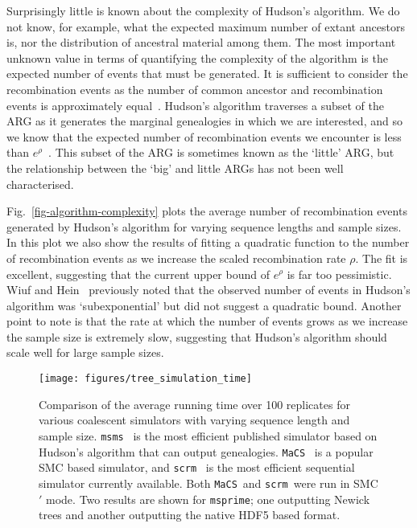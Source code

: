 \documentclass[10pt,letterpaper]{article}
\newcommand{\msms}[0]{\texttt{msms}}
\newcommand{\msprime}[0]{\texttt{msprime}}
\newcommand{\scrm}[0]{\texttt{scrm}}
\newcommand{\MaCS}[0]{\texttt{MaCS}}
\begin{document}
Surprisingly little is known about the complexity of Hudson's algorithm. We do
not know, for example, what the expected maximum number of extant ancestors is,
nor the distribution of ancestral material among them. The most important
unknown value in terms of quantifying the complexity of the algorithm is the
expected number of events that must be generated. It is sufficient to consider
the recombination events as the number of common ancestor and recombination
events is approximately equal~\citep{wh99}. Hudson's algorithm traverses a
subset of the ARG as it generates the marginal genealogies in which we are
interested, and so we know that the expected number of recombination events we
encounter is less than $e^\rho$~\citep{eg90}. This subset of the ARG is
sometimes known as the `little' ARG, but the relationship between the `big' and
little ARGs has not been well characterised.

Fig.~\ref{fig-algorithm-complexity} plots the average number of
recombination events generated by Hudson's algorithm for varying sequence
lengths and sample sizes.  In this plot we also show the results of fitting a
quadratic function to the number of recombination events as we increase the
scaled recombination rate $\rho$. The fit is excellent, suggesting that the
current upper bound of $e^\rho$ is far too pessimistic. Wiuf and Hein~\citep{wh99}
previously
noted that the observed number of events in Hudson's algorithm was
`subexponential' but did not suggest a quadratic bound.  Another point to note is
that the rate at which the number of events grows as we increase the sample
size is extremely slow, suggesting that Hudson's algorithm should scale well
for large sample sizes.

\begin{figure}
    \begin{center}
        \texttt{[image: figures/tree\_simulation\_time]}
    \end{center}
    \caption{\label{fig-tree-simulation-time} Comparison of the average
        running time over 100 replicates for various coalescent simulators
        with varying sequence length and sample size.
        \msms~\citep{eh10} is the most efficient published simulator based on
        Hudson's algorithm that can output genealogies.
        \MaCS~\citep{cmw09} is a popular SMC based simulator, and
        \scrm~\citep{szml14} is the most efficient sequential simulator
        currently available. Both \MaCS\ and \scrm\ were run in SMC$'$ mode.
        Two results are shown for \msprime; one
        outputting Newick trees and another outputting the native HDF5 based format.
        }
\end{figure}
\end{document}
